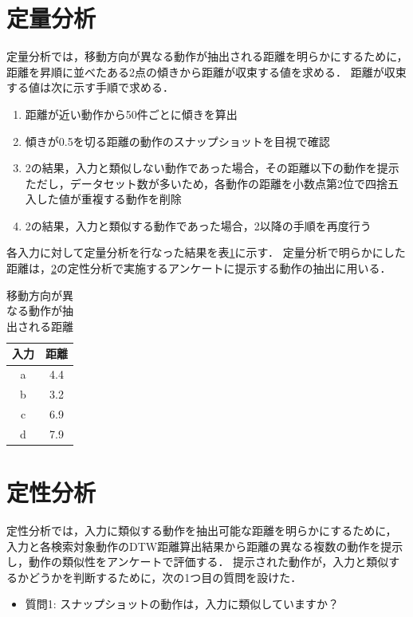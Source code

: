 \documentclass[11pt]{jreport}
\begin{document}
\section{定量分析}
\label{teiryou}
定量分析では，移動方向が異なる動作が抽出される距離を明らかにするために，
距離を昇順に並べたある2点の傾きから距離が収束する値を求める．
距離が収束する値は次に示す手順で求める．

\begin{enumerate}
    \item 距離が近い動作から50件ごとに傾きを算出
    \item 傾きが0.5を切る距離の動作のスナップショットを目視で確認
    \item 2の結果，入力と類似しない動作であった場合，その距離以下の動作を提示
    ただし，データセット数が多いため，各動作の距離を小数点第2位で四捨五入した値が重複する動作を削除
    \item 2の結果，入力と類似する動作であった場合，2以降の手順を再度行う
\end{enumerate}

各入力に対して定量分析を行なった結果を表\ref{quantitativeresult}に示す．
定量分析で明らかにした距離は，\ref{teisei}の定性分析で実施するアンケートに提示する動作の抽出に用いる．
        
\begin{table}[H]
    \caption{移動方向が異なる動作が抽出される距離}
    \label{quantitativeresult}
    \centering
    \begin{tabular}{c|c}
    \hline
    入力 & 距離 \\
    \hline \hline
    a & 4.4 \\
    \hline
    b & 3.2 \\
    \hline
    c & 6.9 \\
    \hline
    d & 7.9 \\
    \hline
    \end{tabular}
\end{table}


\section{定性分析}
\label{teisei}
定性分析では，入力に類似する動作を抽出可能な距離を明らかにするために，
入力と各検索対象動作のDTW距離算出結果から距離の異なる複数の動作を提示し，動作の類似性をアンケートで評価する．
提示された動作が，入力と類似するかどうかを判断するために，次の1つ目の質問を設けた．

\begin{itemize}
    \item 質問1: スナップショットの動作は，入力に類似していますか？
\end{itemize}
\end{document}
